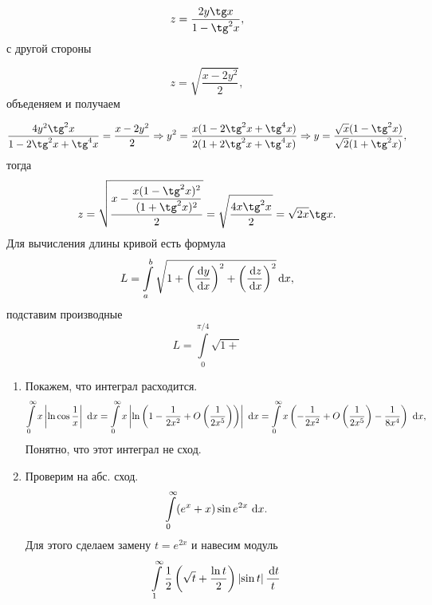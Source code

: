 \documentclass{report}
\begin{document}
\begin{enumerate}
\[
    z = \dfrac{2y\tg x}{1-\tg^2 x},
\]
с другой стороны

\[
    z  = \sqrt{\dfrac{x-2y^2}{2}},
\]
объеденяем и получаем 

\[
    \dfrac{4y^2\tg^2 x}{1-2\tg^2 x+\tg^4 x} = \dfrac{x-2y^2}{2} \Rightarrow y^2 = \dfrac{x(1-2\tg^2 x+\tg^4 x)}{2(1+2\tg^2 x+\tg^4 x)} \Rightarrow y = \dfrac{\sqrt{x}(1-\tg^2 x)}{\sqrt{2}(1+\tg^2 x)},
\]
тогда 
\[
    z = \sqrt{\dfrac{x-\dfrac{x(1-\tg^2 x)^2}{(1+\tg^2 x)^2}}{2}} = \sqrt{\dfrac{4x\tg^2 x}{2}} = \sqrt{2x}\tg x.
\]
Для вычисления длины кривой есть формула
\[
L = \int\limits_{a}^{b}\sqrt{1+\left(\frac{\dl y}{\dl x}\right)^2 + \left(\frac{\dl z}{\dl x}\right)^2}\dl x,
\]
подставим производные
\[
    L = \int\limits_{0}^{\pi/4} \sqrt{1+}
\]

\end{enumerate}

\sol
\begin{enumerate}
    \item 
      Покажем, что интеграл расходится.
    \[
        \int\limits_{0}^{\infty} x\left|\ln \cos \dfrac{1}{x}\right|\, \dl x = \int\limits_{0}^{\infty} x\left|\ln\left(1-\dfrac{1}{2x^2}+O\left(\dfrac{1}{2x^5}\right)\right)\right|\, \dl x = \int\limits_{0}^{\infty} x\left(-\dfrac{1}{2x^2}+O\left(\dfrac{1}{2x^5}\right)-\dfrac{1}{8x^4}\right)\, \dl x,
    \]
    Понятно, что этот интеграл не сход.  
\item 
    Проверим на абс. сход.
    \[
        \int\limits_{0}^{\infty}(e^x+x)\sin e^{2x}\, \dl x.
    \]
    Для этого сделаем замену $t = e^{2x}$ и навесим модуль
    \[
\int\limits_{1}^{\infty} \dfrac{1}{2}\left(\sqrt{t}+\dfrac{\ln t}{2}\right)\left|\sin t\right|\dfrac{\dl t}{t}\,
    \]
    \end{enumerate}
\end{document}
